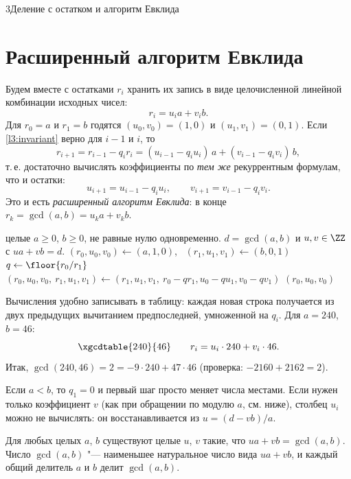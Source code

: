 \begin{lecture}{3}{Деление с остатком и алгоритм Евклида}
\section{Расширенный алгоритм Евклида}

Будем вместе с остатками $r_i$ хранить их запись в виде целочисленной линейной комбинации исходных
чисел:
\begin{equation}\label{l3:invariant}
  r_i = u_i a + v_i b.
\end{equation}
Для $r_0 = a$ и $r_1 = b$ годятся $(u_0, v_0) = (1, 0)$ и $(u_1, v_1) = (0, 1)$. Если
\eqref{l3:invariant} верно для $i - 1$ и $i$, то
\[
  r_{i+1} = r_{i-1} - q_i r_i = (u_{i-1} - q_i u_i)\,a + (v_{i-1} - q_i v_i)\,b,
\]
т.\,е. достаточно вычислять коэффициенты по \emph{тем же} рекуррентным формулам, что и остатки:
\begin{equation}\label{l3:xgcd-rec}
  u_{i+1} = u_{i-1} - q_i u_i, \qquad v_{i+1} = v_{i-1} - q_i v_i.
\end{equation}
Это и есть \emph{расширенный алгоритм Евклида}: в конце $r_k = \gcd(a, b) = u_k a + v_k b$.

\begin{algorithm}
\begin{algorithmic}[1]
\Require целые $a \ge 0$, $b \ge 0$, не равные нулю одновременно.
\Ensure $d = \gcd(a, b)$ и $u, v \in \ZZ$ с $ua + vb = d$.
\State $(r_0, u_0, v_0) \gets (a, 1, 0)$, \ $(r_1, u_1, v_1) \gets (b, 0, 1)$
  \State $q \gets \floor{r_0 / r_1}$
  \State $(r_0, u_0, v_0,\ r_1, u_1, v_1) \gets (r_1, u_1, v_1,\ r_0 - q r_1, u_0 - q u_1, v_0 - q v_1)$
\EndWhile
\State \Return $(r_0, u_0, v_0)$
\end{algorithmic}
\end{algorithm}

Вычисления удобно записывать в таблицу: каждая новая строка получается из двух предыдущих
вычитанием предпоследней, умноженной на $q_i$. Для $a = 240$, $b = 46$:
\[
  \xgcdtable{240}{46} \qquad r_i = u_i \cdot 240 + v_i \cdot 46.
\]
Итак, $\gcd(240, 46) = 2 = -9 \cdot 240 + 47 \cdot 46$ (проверка: $-2160 + 2162 = 2$).

\begin{remark}
Если $a < b$, то $q_1 = 0$ и первый шаг просто меняет числа местами. Если нужен только
коэффициент $v$ (как при обращении по модулю $a$, см. ниже), столбец $u_i$ можно не вычислять:
он восстанавливается из $u = (d - vb)/a$.
\end{remark}

\begin{theorem}\label{l3:bezout}
Для любых целых $a$, $b$ существуют целые $u$, $v$ такие, что $ua + vb = \gcd(a, b)$. Число
$\gcd(a, b)$ "--- наименьшее натуральное число вида $ua + vb$, и каждый общий делитель $a$ и $b$
делит $\gcd(a, b)$.
\end{theorem}


\end{lecture}
